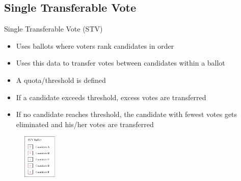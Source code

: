 \documentclass[xcolor=table]{beamer}
\begin{document}
\subsection{Single Transferable Vote}
\begin{frame}{Single Transferable Vote (STV)}
\begin{itemize}
    \item Uses ballots where voters rank candidates in order
    \item Uses this data to transfer votes between candidates within a ballot
    \item A quota/threshold is defined
    \item If a candidate exceeds threshold, excess votes are transferred
    \item If no candidate reaches threshold, the candidate with fewest votes gets eliminated and his/her votes are transferred
\end{itemize}
\begin{figure}
	\centering
	\includegraphics[height=80px]{ballot}
\label{fig:stv ballot}
\end{figure}
\end{frame}
\end{document}
